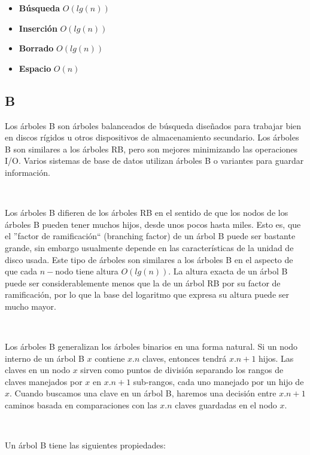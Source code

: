 \begin{itemize}
 \item \textbf{B\'usqueda} $O(lg(n))$
 \item \textbf{Inserci\'on} $O(lg(n))$
 \item \textbf{Borrado} $O(lg(n))$
 \item \textbf{Espacio} $O(n)$
\end{itemize}

\subsection{B}

Los \'arboles B son \'arboles balanceados de b\'usqueda dise\~nados para trabajar bien en discos r\'igidos u otros dispositivos de almacenamiento secundario. Los \'arboles B son similares a los \'arboles RB, pero son mejores minimizando las operaciones I/O. Varios sistemas de base de datos utilizan \'arboles B o variantes para guardar informaci\'on.

~

Los \'arboles B difieren de los \'arboles RB en el sentido de que los nodos de los \'arboles B pueden tener muchos hijos, desde unos pocos hasta miles. Esto es, que el ''factor de ramificaci\'on`` (branching factor) de un \'arbol B puede ser bastante grande, sin embargo usualmente depende en las caracter\'isticas de la unidad de disco usada. Este tipo de \'arboles son similares a los \'arboles B en el aspecto de que cada $n-$nodo tiene altura $O(lg(n))$. La altura exacta de un \'arbol B puede ser considerablemente menos que la de un \'arbol RB por su factor de ramificaci\'on, por lo que la base del logaritmo que expresa su altura puede ser mucho mayor.

~

Los \'arboles B generalizan los \'arboles binarios en una forma natural. Si un nodo interno de un \'arbol B $x$ contiene $x.n$ claves, entonces tendr\'a $x.n+1$  hijos. Las claves en un nodo $x$ sirven como puntos de divisi\'on separando los rangos de claves manejados por $x$ en $x.n+1$ sub-rangos, cada uno manejado por un hijo de $x$. Cuando buscamos una clave en un \'arbol B, haremos una decisi\'on entre $x.n+1$ caminos basada en comparaciones con las $x.n$ claves guardadas en el nodo $x$.

~

Un \'arbol B tiene las siguientes propiedades:

